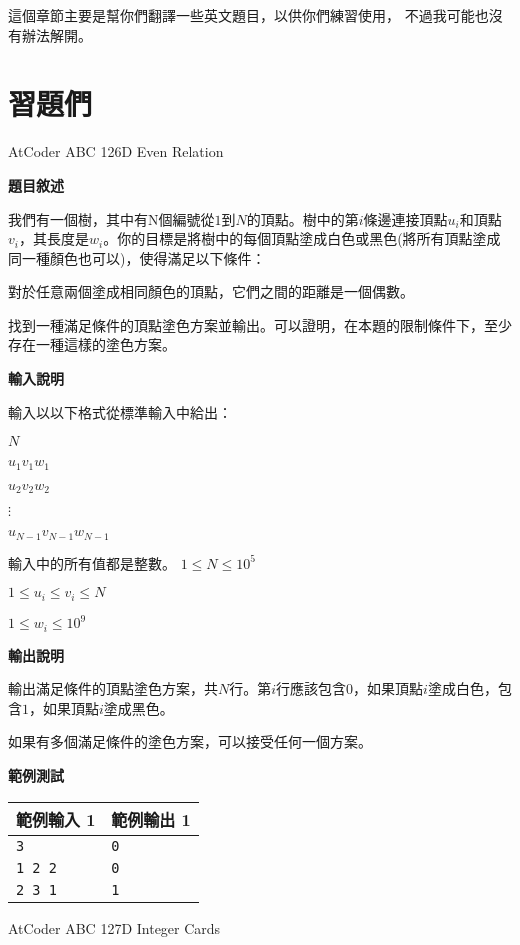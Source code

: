這個章節主要是幫你們翻譯一些英文題目，以供你們練習使用，
不過我可能也沒有辦法解開。

\section{習題們}

    \problem AtCoder ABC 126D Even Relation

    \textbf{題目敘述}

    我們有一個樹，其中有N個編號從$1$到$N$的頂點。樹中的第$i$條邊連接頂點$u_i$和頂點$v_i$，其長度是$w_i$。你的目標是將樹中的每個頂點塗成白色或黑色(將所有頂點塗成同一種顏色也可以)，使得滿足以下條件：

    對於任意兩個塗成相同顏色的頂點，它們之間的距離是一個偶數。

    找到一種滿足條件的頂點塗色方案並輸出。可以證明，在本題的限制條件下，至少存在一種這樣的塗色方案。

    \textbf{輸入說明}

    輸入以以下格式從標準輸入中給出：

    $N$

    $u_1 v_1 w_1$

    $u_2 v_2 w_2$

    $\vdots$

    $u_{N-1} v_{N-1} w_{N-1}$

    輸入中的所有值都是整數。
    $1\le N\le 10^5$

    $1\le u_i \le v_i \le N$

    $1\le w_i\le 10^9$

    \textbf{輸出說明}

    輸出滿足條件的頂點塗色方案，共$N$行。第$i$行應該包含$0$，如果頂點$i$塗成白色，包含$1$，如果頂點$i$塗成黑色。

    如果有多個滿足條件的塗色方案，可以接受任何一個方案。

    \textbf{範例測試}

    \begin{tabular}{|m{7cm}|m{7cm}|}
        \hline
        範例輸入 1 & 範例輸出 1 \\
        \hline
        \verb|3| & \verb|0| \\
        \verb|1 2 2| & \verb|0| \\
        \verb|2 3 1| & \verb|1| \\
        \hline
    \end{tabular}

    \problem AtCoder ABC 127D Integer Cards

